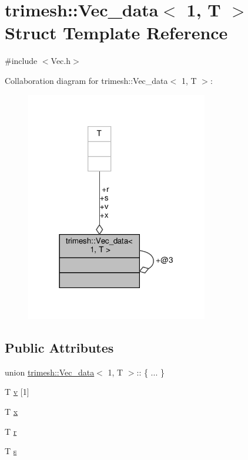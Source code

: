 \hypertarget{structtrimesh_1_1Vec__data_3_011_00_01T_01_4}{}\section{trimesh\+:\+:Vec\+\_\+data$<$ 1, T $>$ Struct Template Reference}
\label{structtrimesh_1_1Vec__data_3_011_00_01T_01_4}


{\ttfamily \#include $<$Vec.\+h$>$}



Collaboration diagram for trimesh\+:\+:Vec\+\_\+data$<$ 1, T $>$\+:\nopagebreak
\begin{figure}[H]
\begin{center}
\leavevmode
\includegraphics[width=225pt]{dc/d5e/structtrimesh_1_1Vec__data_3_011_00_01T_01_4__coll__graph}
\end{center}
\end{figure}
\subsection*{Public Attributes}
\begin{DoxyCompactItemize}
\item 
union \hyperlink{structtrimesh_1_1Vec__data}{trimesh\+::\+Vec\+\_\+data}$<$ 1, T $>$\+:: \{ ... \}  
\item 
T \hyperlink{structtrimesh_1_1Vec__data_3_011_00_01T_01_4_a41d1138a86ccd06df21c4dce9392cb1d}{v} \mbox{[}1\mbox{]}
\item 
T \hyperlink{structtrimesh_1_1Vec__data_3_011_00_01T_01_4_a3adca5743364447d65d3392ca7de30b9}{x}
\item 
T \hyperlink{structtrimesh_1_1Vec__data_3_011_00_01T_01_4_aa7602a68047e676e50bd46aa2f1a3973}{r}
\item 
T \hyperlink{structtrimesh_1_1Vec__data_3_011_00_01T_01_4_a6a8decccb8228cb923364d343d139ba6}{s}
\end{DoxyCompactItemize}


